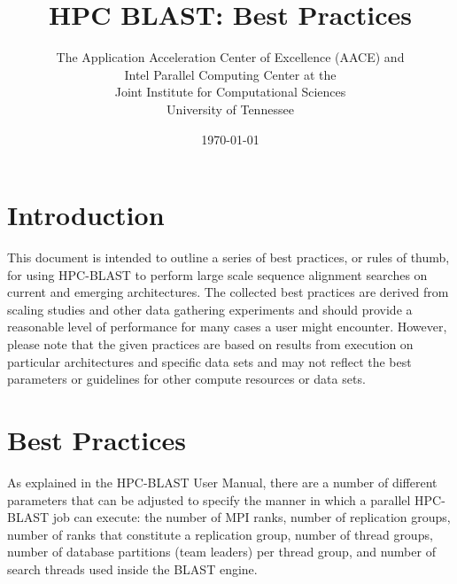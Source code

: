 \documentclass[10pt]{article}
\begin{document}
\title{HPC BLAST: Best Practices\\
         }
\author{The Application Acceleration Center of Excellence (AACE) and\\
   Intel Parallel Computing Center at the\\
   Joint Institute for Computational Sciences\\University of Tennessee}

\date{\today}
\maketitle

\section{Introduction} \label{sec:intro}

This document is intended to outline a series of best practices, or rules of thumb, for using HPC-BLAST to perform large scale sequence alignment
searches on current and emerging architectures.  The collected best practices are derived from scaling studies and other data gathering experiments and
should provide a reasonable level of performance for many cases a user might encounter.  However, please note that the given practices are based on
results from execution on particular architectures and specific data sets and may not reflect the best parameters or guidelines
for other compute resources or data sets.

\section{Best Practices} \label{sec:best-prac}

As explained in the HPC-BLAST User Manual, there are a number of different parameters that can be adjusted to specify the manner in which a parallel HPC-BLAST job
can execute: the number of MPI ranks, number of replication groups, number of ranks that constitute a replication group, number of thread groups, number
of database partitions (team leaders) per thread group, and number of search threads used inside the BLAST engine.\\
\end{document}
